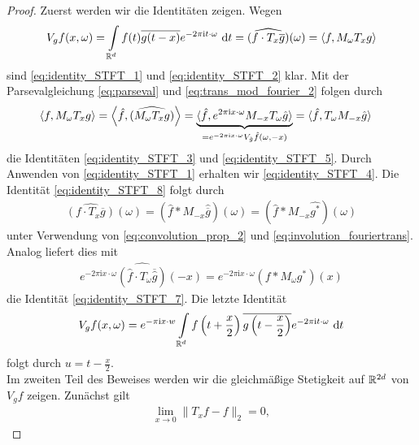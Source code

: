 \begin{proof}
	Zuerst werden wir die Identitäten zeigen.
	Wegen
	\begin{align*}
	V_g f(x,\omega)
	=
	\int \limits_{\mathbb{R}^d} f(t) \overline{g(t-x)} 
	e^{-2\pi \textrm{i} t  \cdot \omega} \text{ d} t
	=
	\widehat{(f \cdot T_x \overline{g})} (\omega)
	=
	\langle f, M_\omega T_x g \rangle
	\end{align*}
	sind \eqref{eq:identity_STFT_1} und \eqref{eq:identity_STFT_2} klar.
	Mit der Parsevalgleichung \eqref{eq:parseval} und \eqref{eq:trans_mod_fourier_2} folgen durch
	\begin{align*}
	\langle f, M_\omega T_x g \rangle
	&=
	\left\langle \hat{f}, \widehat{(M_\omega T_x g)} \right\rangle
	=
	\underbrace{ \langle \hat{f},e^{2\pi \textrm{i} x \cdot \omega} M_{-x} T_\omega \hat{g} \rangle}_{
		= e^{-2\pi \textrm{i} x \cdot \omega} V_{\hat{g}} \hat{f}(\omega,-x)
		}
	= 
	\langle \hat{f}, T_\omega M_{-x} \hat{g} \rangle
	\end{align*}
	die Identitäten \eqref{eq:identity_STFT_3} und \eqref{eq:identity_STFT_5}.
	Durch Anwenden von \eqref{eq:identity_STFT_1} erhalten wir \eqref{eq:identity_STFT_4}.
	Die Identität \eqref{eq:identity_STFT_8} folgt durch
	\begin{align*}
	\widehat{(f \cdot T_x \overline{g})} (\omega)
	=
	(\hat{f} \ast M_{-x}  \hat{\overline{g}} )(\omega)
	=
	(\hat{f} \ast M_{-x}  \hat{g^\ast} )(\omega)
	\end{align*}
	unter Verwendung von \eqref{eq:convolution_prop_2} und \eqref{eq:involution_fouriertrans}.
	Analog liefert dies mit
	\begin{align*}
	e^{-2 \pi \mathrm{i} x \cdot \omega} \widehat{(\hat{f} \cdot T_\omega \overline{ \hat{g} })} (-x)
	=
	e^{-2\pi \mathrm{i} x \cdot \omega}  (f \ast M_\omega g^\ast)(x)
	\end{align*}
	die Identität \eqref{eq:identity_STFT_7}.
	Die letzte Identität 
	\begin{align*} 
	V_g f(x,\omega)
	=
	e^{-\pi \mathrm{i} x \cdot w } \int \limits_{\mathbb{R}^d} f\left( t + \frac{x}{2} \right) \overline{g\left( t - \frac{x}{2} \right)} e^{-2 \pi \mathrm{i} t \cdot \omega} \text{ d} t
	\end{align*}
	folgt durch $u = t  - \frac{x}{2}$.\\
	Im zweiten Teil des Beweises werden wir die gleichmäßige Stetigkeit auf $\mathbb{R}^{2d}$ von $V_g f$ zeigen.
	Zunächst gilt 
	\begin{align*}
	\lim \limits_{x \to 0 } \| T_x f - f \|_2 = 0, 
	\end{align*}

\end{proof}
